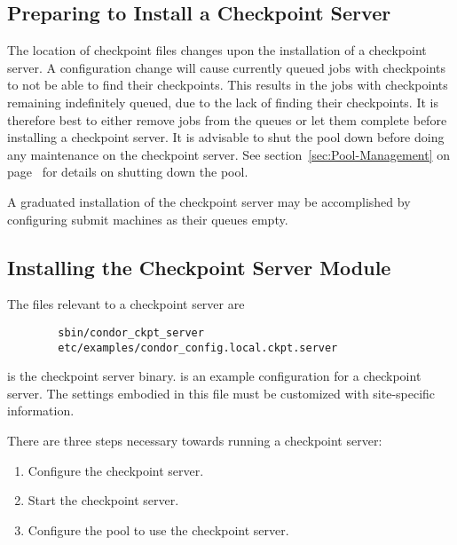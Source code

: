 \subsection{\label{Prepare-Ckpt-Server} Preparing to Install
a Checkpoint Server} 

The location of checkpoint files changes upon the installation
of a checkpoint server.
A configuration change will cause 
currently queued jobs with checkpoints
to not be able to find their checkpoints.
This results in the jobs with checkpoints
remaining indefinitely queued,
due to the lack of finding their checkpoints.
It is therefore best to 
either remove jobs from the queues or let them complete
before installing a checkpoint server.
It is advisable to shut the pool down before doing any
maintenance on the checkpoint server.  
See section~\ref{sec:Pool-Management} on
page~\pageref{sec:Pool-Management} for details on shutting
down the pool. 

A graduated installation of the checkpoint server may be
accomplished by 
configuring submit machines as their queues empty.

\subsection{\label{Install-Ckpt-Server-Module}
Installing the Checkpoint Server Module} 

The files relevant to a checkpoint server are
\begin{verbatim}
        sbin/condor_ckpt_server
        etc/examples/condor_config.local.ckpt.server
\end{verbatim}

 is the checkpoint server binary.
 is an example
configuration for a checkpoint server. The settings embodied in this
file must be customized with site-specific information.

There are three steps necessary towards running a checkpoint server:
\begin{enumerate}
\item Configure the checkpoint server.
\item Start the checkpoint server.
\item Configure the pool to use the checkpoint server.
\end{enumerate}


